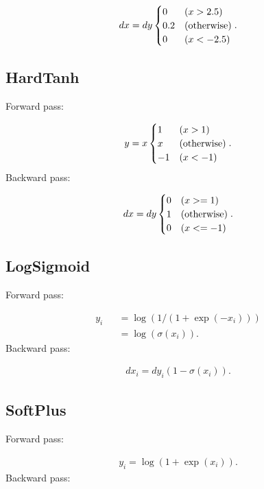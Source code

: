 \documentclass{article}
\begin{document}
\begin{eqnarray}
  dx = dy \begin{cases}
     0 & (x > 2.5) \\
     0.2 & ({\rm otherwise}) \\
     0 & (x < -2.5)
  \end{cases}. 
\end{eqnarray}


\subsection{HardTanh}

Forward pass:

\begin{eqnarray}
  y = x \begin{cases}
     1 & (x > 1) \\
     x & ({\rm otherwise}) \\
     -1 & (x < -1)
  \end{cases}.
\end{eqnarray}
%
Backward pass:

\begin{eqnarray}
  dx = dy \begin{cases}
     0 & (x >= 1) \\
     1 & ({\rm otherwise}) \\
     0 & (x <= -1)
  \end{cases}.
\end{eqnarray}


\subsection{LogSigmoid}

Forward pass:

\begin{eqnarray}
  y_i &&= \log(1 / (1 + \exp(-x_i)))  \\
      &&= \log(\sigma(x_i)).
\end{eqnarray}
%
Backward pass:

\begin{eqnarray}
  dx_i = dy_i (1 - \sigma(x_i)). 
\end{eqnarray}

\subsection{SoftPlus}

Forward pass:

\begin{eqnarray}
  y_i = \log(1+\exp(x_i)).
\end{eqnarray}
%
Backward pass:
\end{document}
